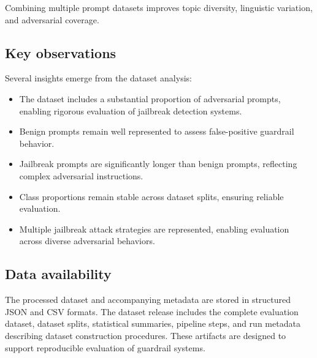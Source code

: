 \documentclass[11pt]{article}
\begin{document}
Combining multiple prompt datasets improves topic diversity, linguistic variation, and adversarial coverage.


\subsection{Key observations}

Several insights emerge from the dataset analysis:

\begin{itemize}
\item The dataset includes a substantial proportion of adversarial prompts, enabling rigorous evaluation of jailbreak detection systems.
\item Benign prompts remain well represented to assess false-positive guardrail behavior.
\item Jailbreak prompts are significantly longer than benign prompts, reflecting complex adversarial instructions.
\item Class proportions remain stable across dataset splits, ensuring reliable evaluation.
\item Multiple jailbreak attack strategies are represented, enabling evaluation across diverse adversarial behaviors.
\end{itemize}


\subsection{Data availability}

The processed dataset and accompanying metadata are stored in structured JSON and CSV formats. The dataset release includes the complete evaluation dataset, dataset splits, statistical summaries, pipeline steps, and run metadata describing dataset construction procedures. These artifacts are designed to support reproducible evaluation of guardrail systems.
\end{document}
